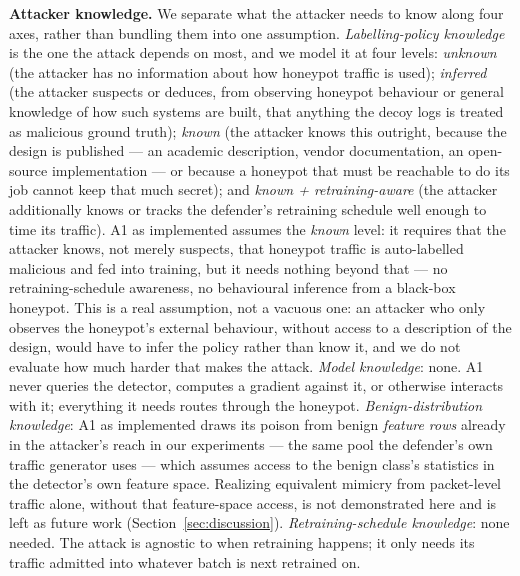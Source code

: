 \textbf{Attacker knowledge.} We separate what the attacker needs to know along four axes, rather
than bundling them into one assumption.
\emph{Labelling-policy knowledge} is the one the attack depends on most, and we model it at four
levels: \emph{unknown} (the attacker has no information about how honeypot traffic is used);
\emph{inferred} (the attacker suspects or deduces, from observing honeypot behaviour or general
knowledge of how such systems are built, that anything the decoy logs is treated as malicious
ground truth); \emph{known} (the attacker knows this outright, because the design is published —
an academic description, vendor documentation, an open-source implementation — or because a
honeypot that must be reachable to do its job cannot keep that much secret); and \emph{known +
retraining-aware} (the attacker additionally knows or tracks the defender's retraining schedule
well enough to time its traffic). A1 as implemented assumes the \emph{known} level: it requires
that the attacker knows, not merely suspects, that honeypot traffic is auto-labelled malicious
and fed into training, but it needs nothing beyond that — no retraining-schedule awareness, no
behavioural inference from a black-box honeypot. This is a real assumption, not a vacuous one: an
attacker who only observes the honeypot's external behaviour, without access to a description of
the design, would have to infer the policy rather than know it, and we do not evaluate how much
harder that makes the attack.
\emph{Model knowledge}: none. A1 never queries the detector, computes a gradient against it, or
otherwise interacts with it; everything it needs routes through the honeypot.
\emph{Benign-distribution knowledge}: A1 as implemented draws its poison from benign \emph{feature
rows} already in the attacker's reach in our experiments — the same pool the defender's own
traffic generator uses — which assumes access to the benign class's statistics in the detector's
own feature space. Realizing equivalent mimicry from packet-level traffic alone, without that
feature-space access, is not demonstrated here and is left as future work
(Section~\ref{sec:discussion}).
\emph{Retraining-schedule knowledge}: none needed. The attack is agnostic to when retraining
happens; it only needs its traffic admitted into whatever batch is next retrained on.

